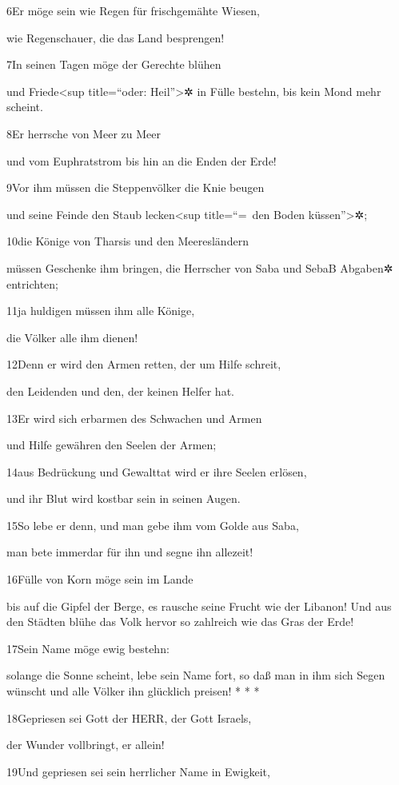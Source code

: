 6Er möge sein wie Regen für frischgemähte Wiesen,

wie Regenschauer, die das Land besprengen!

7In seinen Tagen möge der Gerechte blühen

und Friede\textless sup title=``oder: Heil''\textgreater✲ in Fülle
bestehn, bis kein Mond mehr scheint.

8Er herrsche von Meer zu Meer

und vom Euphratstrom bis hin an die Enden der Erde!

9Vor ihm müssen die Steppenvölker die Knie beugen

und seine Feinde den Staub lecken\textless sup title=``=~den Boden
küssen''\textgreater✲;

10die Könige von Tharsis und den Meeresländern

müssen Geschenke ihm bringen, die Herrscher von Saba und Seba{B}
Abgaben✲ entrichten;

11ja huldigen müssen ihm alle Könige,

die Völker alle ihm dienen!

12Denn er wird den Armen retten, der um Hilfe schreit,

den Leidenden und den, der keinen Helfer hat.

13Er wird sich erbarmen des Schwachen und Armen

und Hilfe gewähren den Seelen der Armen;

14aus Bedrückung und Gewalttat wird er ihre Seelen erlösen,

und ihr Blut wird kostbar sein in seinen Augen.

15So lebe er denn, und man gebe ihm vom Golde aus Saba,

man bete immerdar für ihn und segne ihn allezeit!

16Fülle von Korn möge sein im Lande

bis auf die Gipfel der Berge, es rausche seine Frucht wie der Libanon!
Und aus den Städten blühe das Volk hervor so zahlreich wie das Gras der
Erde!

17Sein Name möge ewig bestehn:

solange die Sonne scheint, lebe sein Name fort, so daß man in ihm sich
Segen wünscht und alle Völker ihn glücklich preisen! * * *

18Gepriesen sei Gott der HERR, der Gott Israels,

der Wunder vollbringt, er allein!

19Und gepriesen sei sein herrlicher Name in Ewigkeit,

